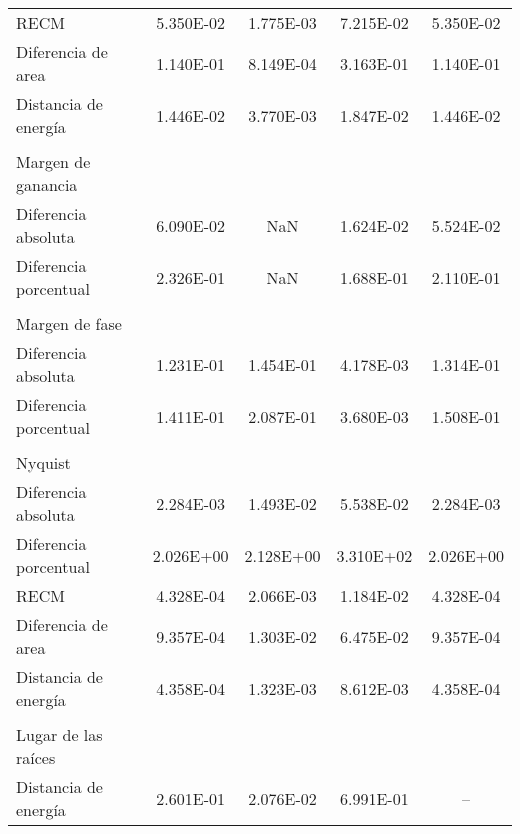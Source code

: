 {\begin{longtable}{l @{\extracolsep{\fill}} cccc}
            RECM                   & \num{5.350E-02} & \num{1.775E-03} & \num{7.215E-02} & \num{5.350E-02}  \\
            Diferencia de area     & \num{1.140E-01} & \num{8.149E-04} & \num{3.163E-01} & \num{1.140E-01}  \\
            Distancia de energía   & \num{1.446E-02} & \num{3.770E-03} & \num{1.847E-02} & \num{1.446E-02}  \\
            & & & & \\
            Margen de ganancia     & & & & \\ \cmidrule{1-1}
            Diferencia absoluta    & \num{6.090E-02} &        NaN      & \num{1.624E-02} & \num{5.524E-02}  \\
            Diferencia porcentual  & \num{2.326E-01} &        NaN      & \num{1.688E-01} & \num{2.110E-01}  \\
            & & & & \\
            Margen de fase         & & & & \\ \cmidrule{1-1}
            Diferencia absoluta    & \num{1.231E-01} & \num{1.454E-01} & \num{4.178E-03} & \num{1.314E-01}  \\
            Diferencia porcentual  & \num{1.411E-01} & \num{2.087E-01} & \num{3.680E-03} & \num{1.508E-01}  \\
            & & & & \\
            Nyquist                & & & & \\ \cmidrule{1-1}
            Diferencia absoluta    & \num{2.284E-03} & \num{1.493E-02} & \num{5.538E-02} & \num{2.284E-03}  \\
            Diferencia porcentual  & \num{2.026E+00} & \num{2.128E+00} & \num{3.310E+02} & \num{2.026E+00}  \\
            RECM                   & \num{4.328E-04} & \num{2.066E-03} & \num{1.184E-02} & \num{4.328E-04}  \\
            Diferencia de area     & \num{9.357E-04} & \num{1.303E-02} & \num{6.475E-02} & \num{9.357E-04}  \\
            Distancia de energía   & \num{4.358E-04} & \num{1.323E-03} & \num{8.612E-03} & \num{4.358E-04}  \\
            & & & & \\
            Lugar de las raíces    & & & & \\ \cmidrule{1-1}
            Distancia de energía   & \num{2.601E-01} & \num{2.076E-02} & \num{6.991E-01} &        --        \\

\end{longtable}}
